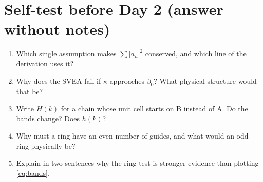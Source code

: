 \documentclass[10pt,a4paper]{article}
\begin{document}
\section{Self-test before Day 2 (answer without notes)}
\begin{enumerate}[itemsep=1pt]
\item Which single assumption makes $\sum|a_n|^2$ conserved, and which line of the derivation uses it?
\item Why does the SVEA fail if $\kappa$ approaches $\beta_0$? What physical structure would that be?
\item Write $H(k)$ for a chain whose unit cell starts on B instead of A. Do the bands change? Does $h(k)$?
\item Why must a ring have an even number of guides, and what would an odd ring physically be?
\item Explain in two sentences why the ring test is stronger evidence than plotting \eqref{eq:bands}.
\end{enumerate}
\end{document}
